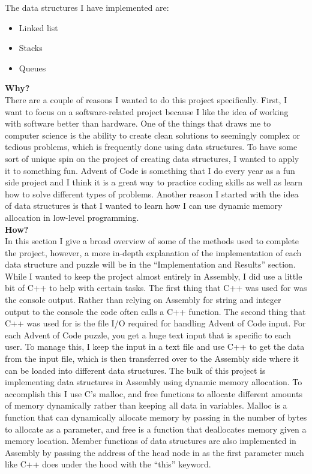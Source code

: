 \documentclass[twoside]{article}
\begin{document}
\noindent The data structures I have implemented are:
\begin{itemize}
    \item Linked list
    \item Stacks
    \item Queues
\end{itemize}

\noindent \textbf{\Large Why?} \\
There are a couple of reasons I wanted to do this project specifically. First, I want to focus on a software-related project because I like the idea of working with software better than hardware. One of the things that draws me to computer science is the ability to create clean solutions to seemingly complex or tedious problems, which is frequently done using data structures. To have some sort of unique spin on the project of creating data structures, I wanted to apply it to something fun. Advent of Code is something that I do every year as a fun side project and I think it is a great way to practice coding skills as well as learn how to solve different types of problems. Another reason I started with the idea of data structures is that I wanted to learn how I can use dynamic memory allocation in low-level programming. \\

\noindent \textbf{\Large How?} \\
In this section I give a broad overview of some of the methods used to complete the project, however, a more in-depth explanation of the implementation of each data structure and puzzle will be in the “Implementation and Results” section. While I wanted to keep the project almost entirely in Assembly, I did use a little bit of C++ to help with certain tasks. The first thing that C++ was used for was the console output. Rather than relying on Assembly for string and integer output to the console the code often calls a C++ function. The second thing that C++ was used for is the file I/O required for handling Advent of Code input. For each Advent of Code puzzle, you get a huge text input that is specific to each user. To manage this, I keep the input in a text file and use C++ to get the data from the input file, which is then transferred over to the Assembly side where it can be loaded into different data structures. The bulk of this project is implementing data structures in Assembly using dynamic memory allocation. To accomplish this I use C’s malloc, and free functions to allocate different amounts of memory dynamically rather than keeping all data in variables. Malloc is a function that can dynamically allocate memory by passing in the number of bytes to allocate as a parameter, and free is a function that deallocates memory given a memory location. Member functions of data structures are also implemented in Assembly by passing the address of the head node in as the first parameter much like C++ does under the hood with the “this” keyword. \\
\end{document}

